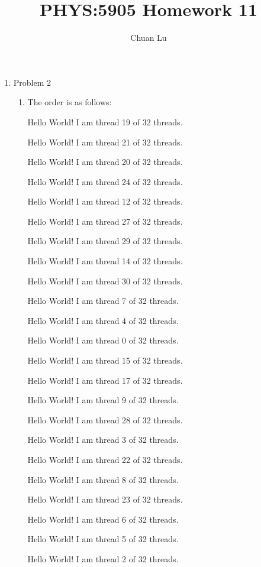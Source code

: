 \documentclass{article}
\begin{document}
\author{Chuan Lu}
\title{PHYS:5905 Homework 11}
\maketitle

\medskip

\begin{enumerate}

\item Problem 2

\begin{enumerate}

\item The order is as follows:

Hello World! I am thread 19 of 32 threads.

Hello World! I am thread 21 of 32 threads.

Hello World! I am thread 20 of 32 threads.

Hello World! I am thread 24 of 32 threads.

Hello World! I am thread 12 of 32 threads.

Hello World! I am thread 27 of 32 threads.

Hello World! I am thread 29 of 32 threads.

Hello World! I am thread 14 of 32 threads.

Hello World! I am thread 30 of 32 threads.

Hello World! I am thread 7 of 32 threads.

Hello World! I am thread 4 of 32 threads.

Hello World! I am thread 0 of 32 threads.

Hello World! I am thread 15 of 32 threads.

Hello World! I am thread 17 of 32 threads.

Hello World! I am thread 9 of 32 threads.

Hello World! I am thread 28 of 32 threads.

Hello World! I am thread 3 of 32 threads.

Hello World! I am thread 22 of 32 threads.

Hello World! I am thread 8 of 32 threads.

Hello World! I am thread 23 of 32 threads.

Hello World! I am thread 6 of 32 threads.

Hello World! I am thread 5 of 32 threads.

Hello World! I am thread 2 of 32 threads.


\end{enumerate}
\end{enumerate}
\end{document}
